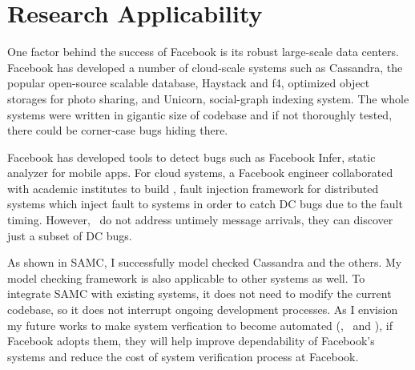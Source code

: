 \documentclass[11pt]{article}
\begin{document}
\section{Research Applicability}

One factor behind the success of Facebook is its robust large-scale data
centers. Facebook has developed a number of cloud-scale systems such as
Cassandra, the popular open-source scalable database, Haystack and f4,
optimized object storages for photo sharing, and Unicorn, social-graph indexing
system. The whole systems were written in gigantic size of codebase and if not
thoroughly tested, there could be corner-case bugs hiding there.

Facebook has developed tools to detect bugs such as Facebook Infer, static
analyzer for mobile apps. For cloud systems, a Facebook engineer collaborated
with academic institutes to build \fad, fault injection framework for
distributed systems which inject fault to systems in order to catch DC bugs due
to the fault timing. However, \fad\ do not address untimely message arrivals,
they can discover just a subset of DC bugs.

As shown in SAMC, I successfully model checked Cassandra and the others. My
model checking framework is also applicable to other systems as well. To
integrate SAMC with existing systems, it does not need to modify the current
codebase, so it does not interrupt ongoing development processes. As I envision
my future works to make system verfication to become automated (\ie, \autocheck\
and \deepcheck), if Facebook adopts them, they will help improve dependability
of Facebook's systems and reduce the cost of system verification process at
Facebook.
\end{document}
